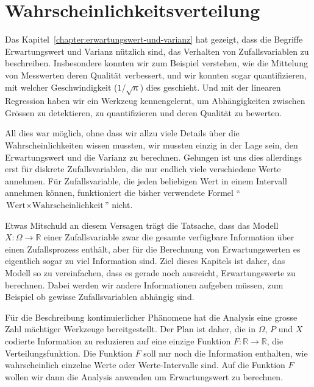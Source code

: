 %
%
%
\chapter{Wahrscheinlichkeitsverteilung} \label{chapter:wahrscheinlichkeitsverteilung}

Das Kapitel~\ref{chapter:erwartungswert-und-varianz} hat gezeigt, dass die
Begriffe Erwartungswert und Varianz nützlich sind, das Verhalten von
Zufallsvariablen zu beschreiben.
Insbesondere konnten wir zum Beispiel verstehen, wie die Mittelung von
Messwerten deren Qualität verbessert, und wir konnten sogar quantifizieren,
mit welcher Geschwindigkeit ($1/\sqrt{n}$) dies geschieht.
Und mit der linearen Regression haben wir ein Werkzeug kennengelernt, 
um Abhängigkeiten zwischen Grössen zu detektieren, zu quantifizieren
und deren Qualität zu bewerten.

All dies war möglich, ohne dass wir allzu viele Details über die
Wahrscheinlichkeiten wissen mussten, wir mussten einzig in der Lage sein,
den Erwartungswert und die Varianz zu berechnen.
Gelungen ist uns dies allerdings erst für diskrete Zufallsvariablen,
die nur endlich viele verschiedene Werte annehmen.
Für Zufallsvariable, die jeden beliebigen Wert in einem Intervall annehmen
können, funktioniert die bisher verwendete Formel
``$\text{Wert}\times\text{Wahrscheinlichkeit}$''
nicht.

Etwas Mitschuld an diesem Versagen trägt die Tatsache, dass das Modell
$X\colon\Omega\to\mathbb R$ einer Zufallsvariable zwar die gesamte verfügbare
Information über einen Zufallsprozess enthält, aber für die Berechnung 
von Erwartungswerten es eigentlich sogar zu viel Information sind.
Ziel dieses Kapitels ist daher, das Modell so zu vereinfachen, dass
es gerade noch ausreicht, Erwartungswerte zu berechnen.
Dabei werden wir andere Informationen aufgeben müssen,
zum Beispiel ob gewisse Zufallsvariablen abhängig sind.

Für die Beschreibung kontinuierlicher Phänomene hat die Analysis
eine grosse Zahl mächtiger Werkzeuge bereitgestellt.
Der Plan ist daher, die in $\Omega$, $P$ und $X$ codierte
Information zu reduzieren auf eine einzige Funktion $F\colon\mathbb R\to\mathbb R$,
die Verteilungsfunktion.
Die Funktion $F$ soll nur noch die Information enthalten, wie wahrscheinlich
einzelne Werte oder Werte-Intervalle sind.
Auf die Funktion $F$ wollen wir dann die Analysis anwenden um 
Erwartungswert zu berechnen.







